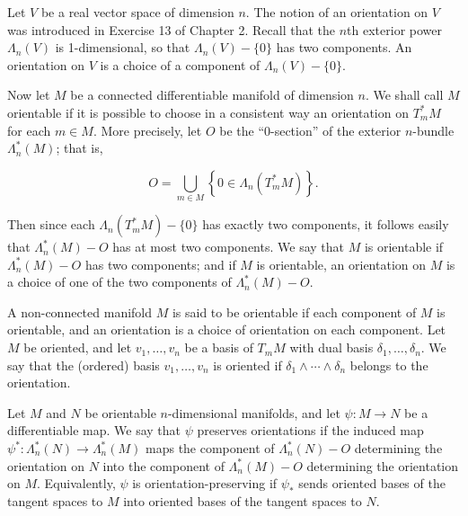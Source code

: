 \begin{definition}\label{thm:4.1}
Let $V$ be a real vector space of dimension $n$. The notion of an orientation on $V$ was introduced in Exercise 13 of Chapter 2. Recall that the $n$th exterior power $\Lambda_n(V)$ is 1-dimensional, so that $\Lambda_n(V) - \{0\}$ has two components. An orientation on $V$ is a choice of a component of $\Lambda_n(V) - \{0\}$. 

Now let $M$ be a connected differentiable manifold of dimension $n$. We shall call $M$ orientable if it is possible to choose in a consistent way an orientation on $T_{m}^{*} M$ for each $m \in M$. More precisely, let $O$ be the “0-section” of the exterior $n$-bundle $\Lambda_n^*(M)$; that is,

\begin{equation}
\tag{1}\label{eq:4.1:1}
O=\bigcup_{m\in M}\left\{0\in\Lambda_{n}(T_{m}^{*} M)\right\}.
\end{equation}

Then since each $\Lambda_n(T_{m}^{*} M) - \{0\}$ has exactly two components, it follows easily that $\Lambda_n^*(M) - O$ has at most two components. We say that $M$ is orientable if $\Lambda_n^*(M) - O$ has two components; and if $M$ is orientable, an orientation on $M$ is a choice of one of the two components of $\Lambda_n^*(M) - O$.

A non-connected manifold $M$ is said to be orientable if each component of $M$ is orientable, and an orientation is a choice of orientation on each component. Let $M$ be oriented, and let $v_{1}, \ldots, v_{n}$ be a basis of $T_{m} M$ with dual basis $\delta_{1}, \ldots, \delta_{n}$. We say that the (ordered) basis $v_{1}, \ldots, v_{n}$ is oriented if $\delta_{1} \wedge \cdots \wedge \delta_{n}$ belongs to the orientation.

Let $M$ and $N$ be orientable $n$-dimensional manifolds, and let $\psi: M \to N$ be a differentiable map. We say that $\psi$ preserves orientations if the induced map $\psi^{*}: \Lambda_n^*(N) \to \Lambda_n^*(M)$ maps the component of $\Lambda_n^*(N) - O$ determining the orientation on $N$ into the component of $\Lambda_n^*(M) - O$ determining the orientation on $M$. Equivalently, $\psi$ is orientation-preserving if $\psi_{*}$ sends oriented bases of the tangent spaces to $M$ into oriented bases of the tangent spaces to $N$.

\end{definition}

